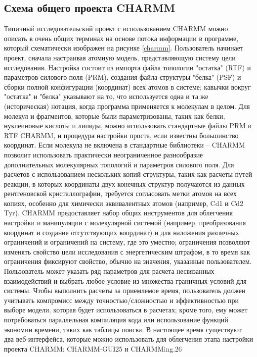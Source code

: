 \subsection{Схема общего проекта CHARMM}

Типичный исследовательский проект с использованием CHARMM можно описать в очень общих терминах на основе потока информации в программе, который схематически изображен на рисунке \ref{charmm}. Пользователь начинает проект, сначала настраивая атомную модель, представляющую систему цели исследования. Настройка состоит из импорта файла топологии "остатка" (RTF) и параметров силового поля (PRM), создания файла структуры "белка" (PSF) и сборки полной конфигурации (координат) всех атомов в системе; кавычки вокруг "остатка" и "белка" указывают на то, что используется одна и та же (историческая) нотация, когда программа применяется к молекулам в целом. Для молекул и фрагментов, которые были параметризованы, таких как белки, нуклеиновые кислоты и липиды, можно использовать стандартные файлы PRM и RTF CHARMM, и процедура настройки проста, если известны большинство координат. Если молекула не включена в стандартные библиотеки -- CHARMM позволит использовать практически неограниченное разнообразие дополнительных молекулярных топологий и параметров силового поля. Для расчетов с использованием нескольких копий структуры, таких как расчеты путей реакции, в которых координаты двух конечных структур получаются из данных рентгеновской кристаллографии, требуется согласовать метки атомов на всех копиях, особенно для химически эквивалентных атомов (например, Cd1 и Cd2 Tyr). CHARMM предоставляет набор общих инструментов для облегчения настройки и манипуляции с молекулярной системой (например, преобразования координат и создание отсутствующих координат) и для наложения различных ограничений и ограничений на систему, где это уместно; ограничения позволяют изменять свойство цели исследования с энергетическим штрафом, в то время как ограничения фиксируют свойство, обычно на значения, указанные пользователем. Пользователь может указать ряд параметров для расчета несвязанных взаимодействий и выбрать любое условие из множества граничных условий для системы. Чтобы выполнить расчеты за приемлемое время, пользователь должен учитывать компромисс между точностью/сложностью и эффективностью при выборе модели, которая будет использоваться в расчетах; кроме того, ему может потребоваться параллельная компиляция кода или использование функций экономии времени, таких как таблицы поиска. В настоящее время существуют два веб-интерфейса, которые можно использовать для облегчения этапа настройки проекта CHARMM: CHARMM-GUI25 и CHARMMing.26

